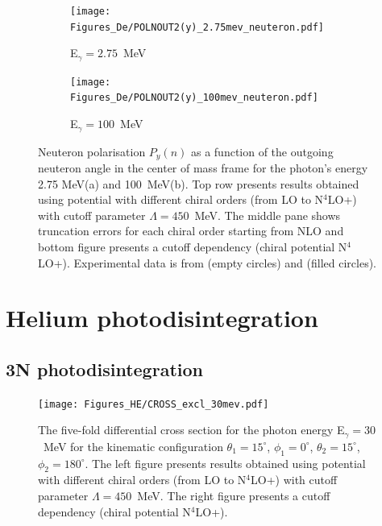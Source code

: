     \begin{figure}[h]
        \centering
        \begin{subfigure}[b]{0.46\textwidth}
            \texttt{[image: Figures\_De/POLNOUT2(y)\_2.75mev\_neuteron.pdf]}
            \caption{\small E$_\gamma = 2.75$~MeV}
            \label{Pn_2p75_vert}
        \end{subfigure}
        \begin{subfigure}[b]{0.46\textwidth}
            \texttt{[image: Figures\_De/POLNOUT2(y)\_100mev\_neuteron.pdf]}
            \caption{\small E$_\gamma = 100$~MeV}
            \label{Pn_100_vert}
        \end{subfigure}
        \caption{Neuteron polarisation $P_y(n)$ 
        as a function of the outgoing neuteron angle in the center of mass frame 
        for the photon's energy 2.75 MeV(a) and 100~MeV(b).
        Top row presents results obtained using potential
        with different chiral orders (from LO to N$^4$LO+) with cutoff parameter $\Lambda=450$~MeV.
        The middle pane shows truncation errors for each 
        chiral order starting from NLO and
        bottom figure presents a cutoff dependency (chiral potential N$^4$LO+).
        Experimental data is from \cite{Jewell_neuteronpolarization} (empty circles)
        and \cite{CAMERON_neuteronpolarization} (filled circles).}
        \label{Pn_2p75_100}
    \end{figure}


\clearpage

\section{Helium photodisintegration}

\subsection{3N photodisintegration}
    \begin{figure}[h]
        \begin{center}
            \texttt{[image: Figures\_HE/CROSS\_excl\_30mev.pdf]}
            \end{center}
            \caption{The five-fold differential cross section for the photon 
            energy E$_\gamma=30$~MeV for the kinematic configuration
            $\theta_1 = 15^\circ$, $\phi_1 = 0^\circ$,
            $\theta_2 = 15^\circ$, $\phi_2 = 180^\circ$.
            The left figure presents results obtained using potential
            with different chiral orders (from LO to N$^4$LO+) with cutoff parameter $\Lambda=450$~MeV.
            The right figure presents a cutoff dependency (chiral potential N$^4$LO+).}
            \label{CROSS_HE_EXCL_30}
        \end{figure}


